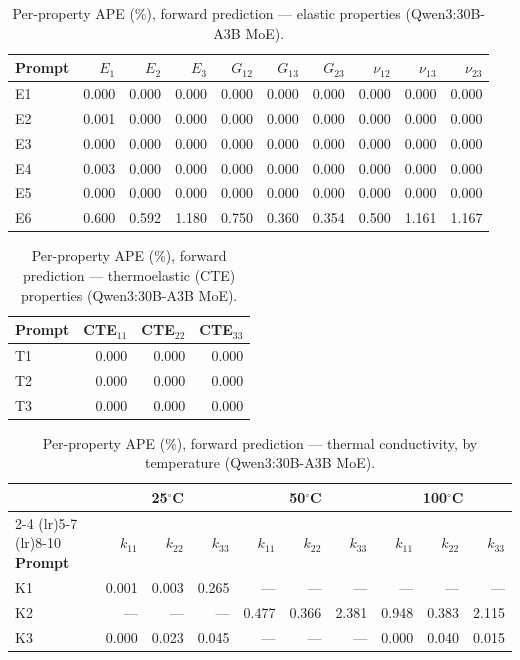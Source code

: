 \documentclass[preprint,review,10pt,number]{elsarticle}
\begin{document}
\begin{table}[htbp]
\centering
\caption{Per-property APE (\%), forward prediction --- elastic properties (Qwen3:30B-A3B MoE).}
\label{tab:mape_elastic}
\begin{tabular}{lrrrrrrrrr}
\toprule
\textbf{Prompt} & $E_1$ & $E_2$ & $E_3$ & $G_{12}$ & $G_{13}$ & $G_{23}$ & $\nu_{12}$ & $\nu_{13}$ & $\nu_{23}$ \\
\midrule
E1 & 0.000 & 0.000 & 0.000 & 0.000 & 0.000 & 0.000 & 0.000 & 0.000 & 0.000 \\
E2 & 0.001 & 0.000 & 0.000 & 0.000 & 0.000 & 0.000 & 0.000 & 0.000 & 0.000 \\
E3 & 0.000 & 0.000 & 0.000 & 0.000 & 0.000 & 0.000 & 0.000 & 0.000 & 0.000 \\
E4 & 0.003 & 0.000 & 0.000 & 0.000 & 0.000 & 0.000 & 0.000 & 0.000 & 0.000 \\
E5 & 0.000 & 0.000 & 0.000 & 0.000 & 0.000 & 0.000 & 0.000 & 0.000 & 0.000 \\
E6 & 0.600 & 0.592 & 1.180 & 0.750 & 0.360 & 0.354 & 0.500 & 1.161 & 1.167 \\
\bottomrule
\end{tabular}
\end{table}

\begin{table}[htbp]
\centering
\caption{Per-property APE (\%), forward prediction --- thermoelastic (CTE) properties (Qwen3:30B-A3B MoE).}
\label{tab:mape_thermoelastic}
\begin{tabular}{lrrr}
\toprule
\textbf{Prompt} & CTE$_{11}$ & CTE$_{22}$ & CTE$_{33}$ \\
\midrule
T1 & 0.000 & 0.000 & 0.000 \\
T2 & 0.000 & 0.000 & 0.000 \\
T3 & 0.000 & 0.000 & 0.000 \\
\bottomrule
\end{tabular}
\end{table}

\begin{table}[htbp]
\centering
\caption{Per-property APE (\%), forward prediction --- thermal conductivity, by temperature (Qwen3:30B-A3B MoE).}
\label{tab:mape_thermal}
\begin{tabular}{lrrrrrrrrr}
\toprule
& \multicolumn{3}{c}{25$^\circ$C} & \multicolumn{3}{c}{50$^\circ$C} & \multicolumn{3}{c}{100$^\circ$C} \\
\cmidrule(lr){2-4} \cmidrule(lr){5-7} \cmidrule(lr){8-10}
\textbf{Prompt} & $k_{11}$ & $k_{22}$ & $k_{33}$ & $k_{11}$ & $k_{22}$ & $k_{33}$ & $k_{11}$ & $k_{22}$ & $k_{33}$ \\
\midrule
K1 & 0.001 & 0.003 & 0.265 & --- & --- & --- & --- & --- & --- \\
K2 & --- & --- & --- & 0.477 & 0.366 & 2.381 & 0.948 & 0.383 & 2.115 \\
K3 & 0.000 & 0.023 & 0.045 & --- & --- & --- & 0.000 & 0.040 & 0.015 \\
\bottomrule
\end{tabular}
\end{table}
\end{document}
